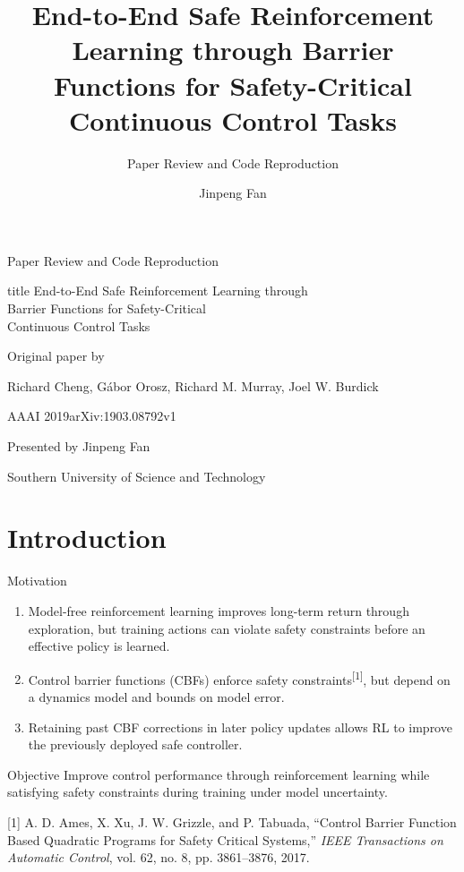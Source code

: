 \documentclass[aspectratio=169,10pt]{beamer}
\title[Safe Reinforcement Learning with CBFs]{End-to-End Safe Reinforcement Learning through Barrier Functions for Safety-Critical Continuous Control Tasks}
\subtitle{Paper Review and Code Reproduction}
\author{Jinpeng Fan}
\institute{Southern University of Science and Technology}
\date{}
\newcommand{\warn}[1]{\textcolor{negative}{#1}}
\begin{document}
\begin{frame}
\centering
{\color{positive}\large Paper Review and Code Reproduction\par}
\vspace{.8em}
\begin{beamercolorbox}[sep=.75em,center,rounded=true]{title}
\fontsize{18}{22}\selectfont
End-to-End Safe Reinforcement Learning through\\
Barrier Functions for Safety-Critical\\
Continuous Control Tasks
\end{beamercolorbox}
\vspace{1em}
{\small\color{gray}Original paper by\par}
\vspace{.3em}
{\normalsize Richard Cheng, G\'abor Orosz, Richard M. Murray, Joel W. Burdick\par}
\vspace{.35em}
{\small AAAI 2019\enspace\textbar\enspace arXiv:1903.08792v1\par}
\vspace{1.2em}
{\color{positive}\normalsize Presented by Jinpeng Fan\par}
\vspace{.3em}
{\small Southern University of Science and Technology\par}
\end{frame}
\section{Introduction}
\begin{frame}{Motivation}
\begin{enumerate}\setlength\itemsep{.9em}
\item Model-free reinforcement learning improves long-term return through exploration, but training actions can \warn{violate safety constraints before an effective policy is learned}.
\item Control barrier functions (CBFs) enforce safety constraints\textsuperscript{[1]}, but \warn{depend on a dynamics model and bounds on model error}.
\item Retaining past CBF corrections in later policy updates allows RL to improve the \warn{previously deployed safe controller}.
\end{enumerate}
\vspace{.6em}
\begin{block}{Objective}
Improve control performance through reinforcement learning while satisfying safety constraints during training under model uncertainty.
\end{block}
\vfill
{\fontsize{6.5}{8}\selectfont\color{gray}
[1] A. D. Ames, X. Xu, J. W. Grizzle, and P. Tabuada, ``Control Barrier Function Based Quadratic Programs for Safety Critical Systems,'' \emph{IEEE Transactions on Automatic Control}, vol. 62, no. 8, pp. 3861--3876, 2017.\par}
\end{frame}
\end{document}
